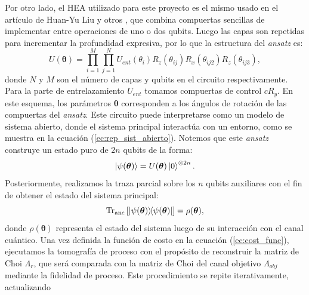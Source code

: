 \documentclass[letterpaper,12pt]{thesisECFM}
\theoremstyle{plain}
\theoremstyle{definition}
\theoremstyle{definition}
\theoremstyle{remark}
\newcommand{\1}{\mathbb{1}}
\begin{document}
Por otro lado, el HEA utilizado para este proyecto es el mismo usado en el
artículo de Huan-Yu Liu y otros \cite{Liu_2021,Sim_2019}, que combina
compuertas sencillas de implementar entre operaciones de uno o dos qubits.
Luego las capas son repetidas para incrementar la profundidad expresiva, por
lo que la estructura del \textit{ansatz} es:
 \begin{equation}
 \label{ec:ansatz}
     U(\bm{\theta}) =\prod_{i=1}^{M} \prod_{j=1}^N U_{ent} (\theta_i)R_z(\theta_{ij})R_x(\theta_{ij2})R_z(\theta_{ij3}),
 \end{equation}
donde $N$ y $M$ son el número de capas y qubits en el circuito respectivamente.
Para la parte de entrelazamiento $U_{ent}$ tomamos compuertas de control
$cR_y$.  En este esquema, los parámetros $\bm{\theta}$ corresponden a los
ángulos de rotación de las compuertas del \textit{ansatz}. Este circuito puede
interpretarse como un modelo de sistema abierto, donde el sistema principal
interactúa con un entorno, como se muestra en la
ecuación (\ref{ec:rep_sist_abierto}).
Notemos que este \textit{ansatz} construye un estado puro de  $2n$ qubits de la forma:
\begin{equation} 
    \ket{\psi(\bm{\theta})} = U(\bm{\theta})\ket{0}^{\otimes 2n}.
\end{equation}
Posteriormente, realizamos la traza parcial sobre los $n$ qubits auxiliares con el fin de obtener el estado del sistema principal:
\begin{equation} \label{ec:tr_anc}    \text{Tr}_{\text{anc}}\left[\ketbra{\psi(\bm{\theta})}{\psi(\bm{\theta})}\right] = \rho(\bm{\theta}),
\end{equation}
donde $\rho(\bm{\theta})$ representa el estado del sistema luego de su
interacción con el canal cuántico. Una vez definida la función de costo en la
ecuación (\ref{ec:cost_func}), ejecutamos la tomografía de proceso
con el propósito de reconstruir la matriz de Choi
$\Lambda_{r}$, que será comparada con la matriz de Choi del canal objetivo
$\Lambda_{obj}$ mediante la fidelidad de proceso.
Este procedimiento se repite iterativamente, actualizando
\end{document}
